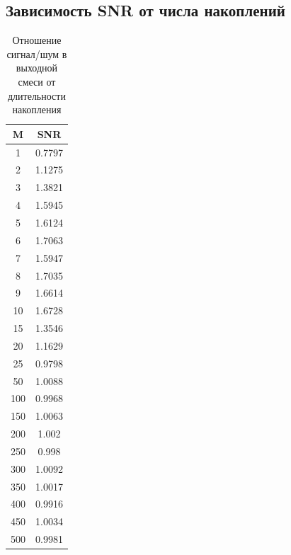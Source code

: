 \documentclass[12pt, a4paper] {ncc}
\begin{document}
    \subsection{Зависимость SNR от числа накоплений}
        \begin{table}[H]
            \centering
            \begin{tabular} { |c|c| }
                \hline
                \textbf{M} & \textbf{SNR} \\ \hline
                    1   &   0.7797  \\ \hline
                    2   &   1.1275  \\ \hline
                    3   &   1.3821  \\ \hline
                    4   &   1.5945  \\ \hline
                    5   &   1.6124  \\ \hline
                    6   &   1.7063  \\ \hline
                    7   &   1.5947  \\ \hline
                    8   &   1.7035  \\ \hline
                    9   &   1.6614  \\ \hline
                    10  &   1.6728  \\ \hline
                    15  &   1.3546  \\ \hline
                    20  &   1.1629  \\ \hline
                    25  &   0.9798  \\ \hline
                    50  &   1.0088  \\ \hline
                    100 &   0.9968  \\ \hline
                    150 &   1.0063  \\ \hline
                    200 &   1.002   \\ \hline
                    250 &   0.998   \\ \hline
                    300 &   1.0092  \\ \hline
                    350 &   1.0017  \\ \hline
                    400 &   0.9916  \\ \hline
                    450 &   1.0034  \\ \hline
                    500 &   0.9981  \\ \hline
            \end{tabular}
            \caption{Отношение сигнал/шум в выходной смеси от длительности накопления}
        \end{table}
\end{document}
